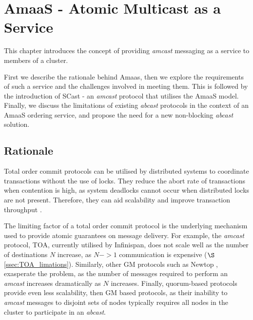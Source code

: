 \chapter{AmaaS - Atomic Multicast as a Service}

    \graphicspath{{Chapter3-TxService/Figs/Vector/}{Chapter3-TxService/Figs/}}

This chapter introduces the concept of providing \emph{amcast} messaging as a service to members of a cluster.

First we describe the rationale behind \textsf{Amaas}, then we explore the requirements of such a service and the challenges involved in meeting them.  This is followed by the introduction of \textsf{SCast} - an \emph{amcast} protocol that utilises the \textsf{AmaaS} model.  Finally, we discuss the limitations of existing \emph{abcast} protocols in the context of an \textsf{AmaaS} ordering service, and propose the need for a new non-blocking \emph{abcast} solution.  

\section{Rationale}
Total order commit protocols can be utilised by distributed systems to coordinate transactions without the use of locks.  They reduce the abort rate of transactions when contention is high, as system deadlocks cannot occur when distributed locks are not present.  Therefore, they can aid scalability and improve transaction throughput \citep{Ruivo:2011:ETO:2120967.2121604}.  

The limiting factor of a total order commit protocol is the underlying mechanism used to provide atomic guarantees on message delivery.  For example, the \emph{amcast} protocol, TOA, currently utilised by Infinispan, does not scale well as the number of destinations $N$ increase, as $N->1$ communication is expensive ($\S$ \ref{ssec:TOA_limations}).  Similarly, other GM protocols such as Newtop \citep{Ezhilchelvan:1995:NFG:876885.880005}, exasperate the problem, as the number of messages required to perform an \emph{amcast} increases dramatically as $N$ increases.  Finally, quorum-based protocols provide even less scalability, then GM based protocols, as their inability to \emph{amcast} messages to disjoint sets of nodes typically requires all nodes in the cluster to participate in an \emph{abcast}.  

